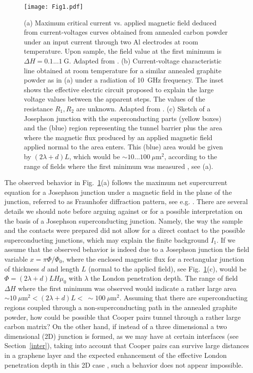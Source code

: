 \documentclass[aps,dvipsnames,twocolumn,floatfix,amsmath]{revtex4-1}
\begin{document}
\begin{figure}
\begin{center}
\texttt{[image: Fig1.pdf]}
\caption{(a) Maximum critical current vs. applied magnetic field
deduced from current-voltages curves obtained from annealed carbon
powder under an input current through  two Al electrodes at
room temperature. Upon sample, the field value at the first minimum
is $\Delta H = 0.1 \ldots 1~$G. Adapted from \cite{ant74}.
(b) Current-voltage characteristic line obtained at room temperature
for a similar annealed graphite powder as in (a) under a radiation
of 10~GHz frequency. The inset shows the effective electric
circuit proposed to explain the large voltage values between the
apparent steps. The values of the resistance $R_1,R_2$ are unknown. Adapted
from \cite{ant75}. (c) Sketch of a Josephson junction with the
superconducting parts (yellow boxes) and the (blue) region representing the tunnel barrier
plus the area where the magnetic flux
produced by an applied magnetic field applied normal to the area
 enters. This (blue) area would be given by $(2 \lambda
+ d)L$, which would be $ \sim 10 \ldots 100~\mu$m$^2$,  according to the range of
fields where the first minimum was measured  \cite{ant74}, see (a).}
\label{fig1}       %
\end{center}
\end{figure}

The observed behavior in Fig.~\ref{fig1}(a) follows the maximum
net  supercurrent equation for a Josephson junction under a
magnetic field in the plane of the junction, referred to as
Fraunhofer diffraction pattern, see e.g. \cite{tin96}. There are
several details we should note before arguing against or for a
possible interpretation on the basis of a Josephson
superconducting junction. Namely,  the way the sample and the
contacts were prepared did not allow for a direct contact to the
possible superconducting junctions, which may explain the finite
background $I_1$. If we assume that the observed behavior is
indeed due to a Josephson junction the field variable $x = \pi
\Phi/ \Phi_0$, where the enclosed magnetic flux for a rectangular
junction of thickness $d$ and length $L$ (normal to the applied
field), see Fig.~\ref{fig1}(c), would be $\Phi = (2 \lambda + d)L
H\mu_0$ with $\lambda$ the London penetration depth. The range of
field $\Delta H$ where the first minimum was observed would
indicate a rather large area $\sim 10~\mu$m$^2 < (2 \lambda + d)L
< ~\sim100~\mu$m$^2$. Assuming that there are superconducting
regions coupled through a non-superconducting path in the annealed
graphite powder, how could be possible that Cooper pairs tunnel
through a rather large carbon matrix? On the other hand, if
instead of a three dimensional a two dimensional (2D) junction is
formed, as we may have at certain interfaces (see
Section~\ref{inter}), taking into account that Cooper pairs can
survive large distances in a graphene layer \cite{hee07} and the
expected enhancement of the effective London penetration depth in
this 2D case \cite{pea64}, such a behavior does not appear
impossible.
\end{document}
